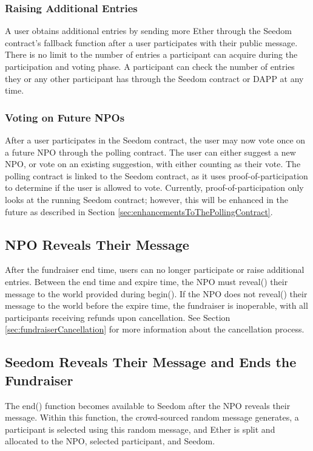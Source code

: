 \documentclass[11pt]{article}
\begin{document}
\subsubsection{Raising Additional Entries}

A user obtains additional entries by sending more Ether through the Seedom contract's fallback function after a user participates with their public message. There is no limit to the number of entries a participant can acquire during the participation and voting phase. A participant can check the number of entries they or any other participant has through the Seedom contract or DAPP at any time.

\subsubsection{Voting on Future NPOs}

After a user participates in the Seedom contract, the user may now vote once on a future NPO through the polling contract. The user can either suggest a new NPO, or vote on an existing suggestion, with either counting as their vote. The polling contract is linked to the Seedom contract, as it uses proof-of-participation to determine if the user is allowed to vote. Currently, proof-of-participation only looks at the running Seedom contract; however, this will be enhanced in the future as described in Section \ref{sec:enhancementsToThePollingContract}.

\subsection{NPO Reveals Their Message}

After the fundraiser end time, users can no longer participate or raise additional entries. Between the end time and expire time, the NPO must reveal() their message to the world provided during begin(). If the NPO does not reveal() their message to the world before the expire time, the fundraiser is inoperable, with all participants receiving refunds upon cancellation. See Section \ref{sec:fundraiserCancellation} for more information about the cancellation process.

\subsection{Seedom Reveals Their Message and Ends the Fundraiser}
\label{sec:seedomRevealsTheirMessageAndEndsTheFundraiser}

The end() function becomes available to Seedom after the NPO reveals their message. Within this function, the crowd-sourced random message generates, a participant is selected using this random message, and Ether is split and allocated to the NPO, selected participant, and Seedom.
\end{document}
